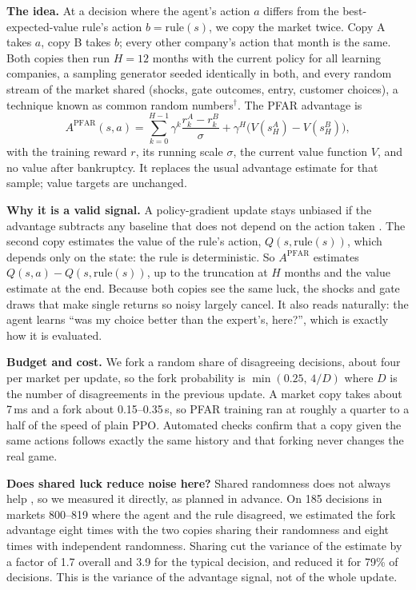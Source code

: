 \documentclass[11pt]{article}
\newcommand{\gl}[1]{#1\hyperref[app:glossary]{$^{\dagger}$}}
\begin{document}
\textbf{The idea.} At a decision where the agent's action $a$ differs from the best-expected-value rule's action $b=\text{rule}(s)$, we copy the market twice. Copy A takes $a$, copy B takes $b$; every other company's action that month is the same. Both copies then run $H=12$ months with the current policy for all learning companies, a sampling generator seeded identically in both, and every random stream of the market shared (shocks, gate outcomes, entry, customer choices), a technique known as \gl{common random numbers}. The PFAR advantage is
\begin{equation}
A^{\text{PFAR}}(s,a) = \sum_{k=0}^{H-1} \gamma^k \frac{r^{A}_{k} - r^{B}_{k}}{\sigma} + \gamma^{H}\big(V(s^{A}_{H}) - V(s^{B}_{H})\big),
\end{equation}
with the training reward $r$, its running scale $\sigma$, the current value function $V$, and no value after bankruptcy. It replaces the usual advantage estimate for that sample; value targets are unchanged.

\textbf{Why it is a valid signal.} A policy-gradient update stays unbiased if the advantage subtracts any baseline that does not depend on the action taken \citep{sutton2018rl}. The second copy estimates the value of the rule's action, $Q(s,\text{rule}(s))$, which depends only on the state: the rule is deterministic. So $A^{\text{PFAR}}$ estimates $Q(s,a) - Q(s,\text{rule}(s))$, up to the truncation at $H$ months and the value estimate at the end. Because both copies see the same luck, the shocks and gate draws that make single returns so noisy largely cancel. It also reads naturally: the agent learns ``was my choice better than the expert's, here?'', which is exactly how it is evaluated.

\textbf{Budget and cost.} We fork a random share of disagreeing decisions, about four per market per update, so the fork probability is $\min(0.25,\,4/D)$ where $D$ is the number of disagreements in the previous update. A market copy takes about 7\,ms and a fork about 0.15--0.35\,s, so PFAR training ran at roughly a quarter to a half of the speed of plain PPO. Automated checks confirm that a copy given the same actions follows exactly the same history and that forking never changes the real game.

\textbf{Does shared luck reduce noise here?} Shared randomness does not always help \citep{sakib2026luck}, so we measured it directly, as planned in advance. On 185 decisions in markets 800--819 where the agent and the rule disagreed, we estimated the fork advantage eight times with the two copies sharing their randomness and eight times with independent randomness. Sharing cut the variance of the estimate by a factor of 1.7 overall and 3.9 for the typical decision, and reduced it for 79\% of decisions. This is the variance of the advantage signal, not of the whole update.
\end{document}
